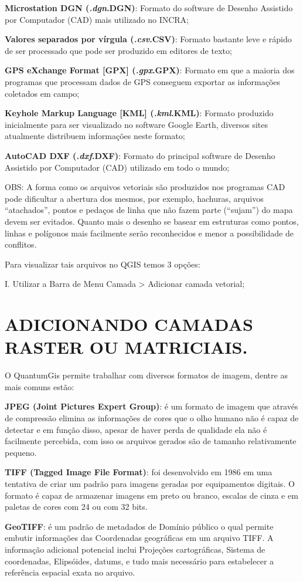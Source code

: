 \documentclass[
  11pt,
  a4paper,
]{book}
\begin{document}
\textbf{Microstation DGN (\emph{.dgn}.DGN)}: Formato do software de
Desenho Assistido por Computador (CAD) mais utilizado no INCRA;

\textbf{Valores separados por vírgula (\emph{.csv}.CSV)}: Formato
bastante leve e rápido de ser processado que pode ser produzido em
editores de texto;

\textbf{GPS eXchange Format {[}GPX{]} (\emph{.gpx}.GPX)}: Formato em que
a maioria dos programas que processam dados de GPS conseguem exportar as
informações coletados em campo;

\textbf{Keyhole Markup Language {[}KML{]} (\emph{.kml}.KML)}: Formato
produzido inicialmente para ser visualizado no software Google Earth,
diversos sites atualmente distribuem informações neste formato;

\textbf{AutoCAD DXF (\emph{.dxf}.DXF)}: Formato do principal software de
Desenho Assistido por Computador (CAD) utilizado em todo o mundo;

OBS: A forma como os arquivos vetoriais são produzidos nos programas CAD
pode dificultar a abertura dos mesmos, por exemplo, hachuras, arquivos
``atachados'', pontos e pedaços de linha que não fazem parte (``sujam'')
do mapa devem ser evitados. Quanto mais o desenho se basear em
estruturas como pontos, linhas e polígonos mais facilmente serão
reconhecidos e menor a possibilidade de conflitos.

Para visualizar tais arquivos no QGIS temos 3 opções:

I. Utilizar a Barra de Menu Camada \textgreater{} Adicionar camada
vetorial;

\chapter{ADICIONANDO CAMADAS RASTER OU
MATRICIAIS.}\label{adicionando-camadas-raster-ou-matriciais.}

O QuantumGis permite trabalhar com diversos formatos de imagem, dentre
as mais comuns estão:

\textbf{JPEG (Joint Pictures Expert Group)}: é um formato de imagem que
através de compressão elimina as informações de cores que o olho humano
não é capaz de detectar e em função disso, apesar de haver perda de
qualidade ela não é facilmente percebida, com isso os arquivos gerados
são de tamanho relativamente pequeno.

\textbf{TIFF (Tagged Image File Format)}: foi desenvolvido em 1986 em
uma tentativa de criar um padrão para imagens geradas por equipamentos
digitais. O formato é capaz de armazenar imagens em preto ou branco,
escalas de cinza e em paletas de cores com 24 ou com 32 bits.

\textbf{GeoTIFF}: é um padrão de metadados de Domínio público o qual
permite embutir informações das Coordenadas geográficas em um arquivo
TIFF. A informação adicional potencial inclui Projeções cartográficas,
Sistema de coordenadas, Elipsóides, datums, e tudo mais necessário para
estabelecer a referência espacial exata no arquivo.


\backmatter
\end{document}
